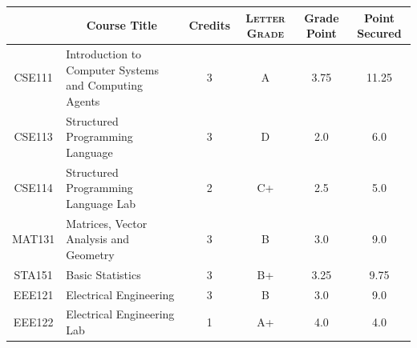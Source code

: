 \documentclass[11pt]{article}
\newcommand*{\numtwo}[1]{\pgfmathprintnumber[
                    fixed, precision=2, fixed zerofill=true]{#1}}
\begin{document}
                \begin{center}
                    \renewcommand{\arraystretch}{1.08}
                    
                \begin{tabular}{|c|l|c|>{\scshape}c|c|c|}
                \hline  \rule[-1ex]{0pt}{3.5ex} {\centering{\bf Course Code}} &  \multicolumn{1}{c|}{\textbf{Course Title}}  & {\bf Credits} & {\bf Letter Grade} & {\bf Grade Point} & {\bf Point Secured}  \\ 
                \hline   CSE111 &  Introduction to Computer Systems and Computing Agents		 & 3 & A & 3.75 & 11.25 \\ %
                \hline   CSE113 &  Structured Programming Language		 & 3 & D & 2.0 & 6.0 \\ %
                \hline   CSE114 &  Structured Programming Language Lab		 & 2 & C+ & 2.5 & 5.0 \\ %
                \hline   MAT131 &  Matrices, Vector Analysis and Geometry		 & 3 & B & 3.0 & 9.0 \\ %
                \hline   STA151 &  Basic Statistics		 & 3 & B+ & 3.25 & 9.75 \\ %
                \hline   EEE121 &  Electrical Engineering		 & 3 & B & 3.0 & 9.0 \\ %
                \hline   EEE122 &  Electrical Engineering Lab		 & 1 & A+ & 4.0 & 4.0 \\ %

\hline                %
                \end{tabular}
                \end{center}
                \renewcommand{\arraystretch}{1.03}
\end{document}
